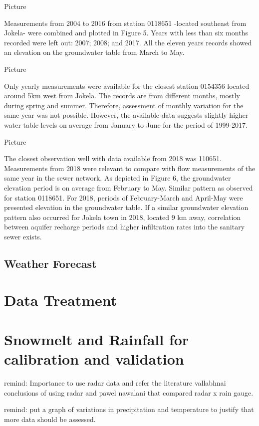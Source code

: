 Picture

Measurements from 2004 to 2016 from station 0118651 -located southeast from Jokela- were combined and plotted in Figure 5. Years with less than six months recorded were left out: 2007; 2008; and 2017. All the eleven years records showed an elevation on the groundwater table from March to May. 

Picture

Only yearly measurements were available for the closest station 0154356 located around 5km west from Jokela. The records are from different months, mostly during spring and summer. Therefore, assessment of monthly variation for the same year was not possible. However, the available data suggests slightly higher water table levels on average from January to June for the period of 1999-2017.

Picture

The closest observation well with data available from 2018 was 110651. Measurements from 2018 were relevant to compare with flow measurements of the same year in the sewer network. As depicted in Figure 6, the groundwater elevation period is on average from February to May. Similar pattern as observed for station 0118651. For 2018, periods of February-March and April-May were presented elevation in the groundwater table. If a similar groundwater elevation pattern also occurred for Jokela town in 2018, located 9 km away, correlation between aquifer recharge periods and higher infiltration rates into the sanitary sewer exists. 
    
    
    \subsection{Weather Forecast}

\section{Data Treatment}

\section{Snowmelt and Rainfall for calibration and validation}



remind: Importance to use radar data and refer the literature vallabhnai conclusions of using radar and pawel nawalani that compared radar x rain gauge. 

remind: put a graph of variations in precipitation and temperature to justify that more data should be assessed. 


